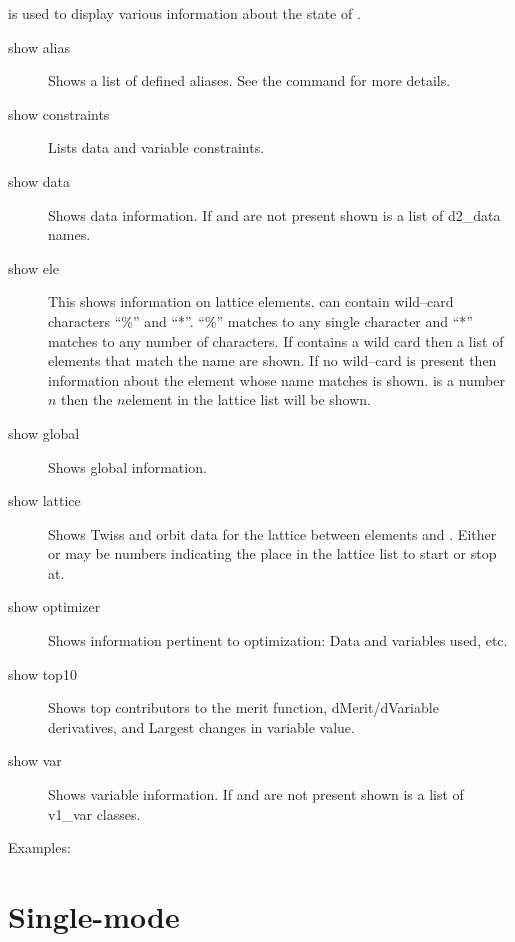 \vskip 0.2in
 is used to display various information about the state of \tao.
\begin{description}
\item[show alias]
Shows a list of defined aliases. See the  command for more
details.
\item[show constraints]
Lists data and variable constraints.
\item[show data]
Shows data information. If  and  are not
present shown is a list of d2\_data names.
\item[show ele]
This shows information on lattice elements.  can
contain wild--card characters ``\%'' and ``*''. ``\%'' matches to any
single character and ``*'' matches to any number of characters. If
 contains a wild card then a list of elements that
match the name are shown. If no wild--card is present then information
about the element whose name matches  is
shown.  is a number $n$ then the $n$\Th element in the
lattice list will be shown.
\item[show global]
Shows global information.
\item[show lattice]
Shows Twiss and orbit data for the  lattice between elements
 and . Either  or
 may be numbers indicating the place in the lattice
list to start or stop at.
\item[show optimizer]
Shows information pertinent to optimization: Data and variables used, etc.
\item[show top10]
Shows top contributors to the merit function, dMerit/dVariable
derivatives, and Largest changes in variable value.
\item[show var]
Shows variable information. If  and  are
not present shown is a list of v1\_var classes.
\end{description}

Examples:

\section{Single-mode}
\label{s:sing}

